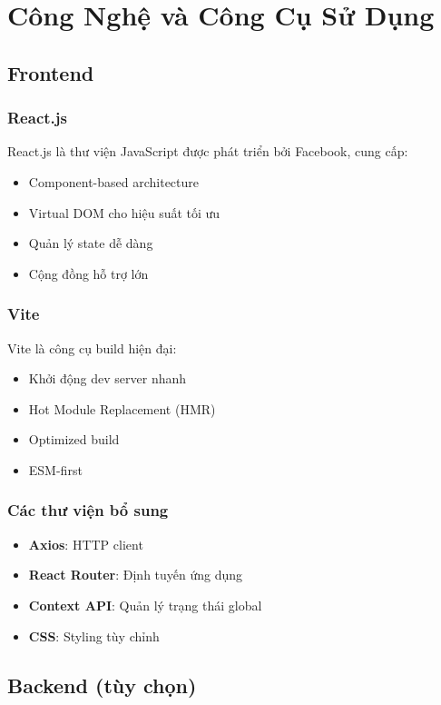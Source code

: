 \documentclass[12pt,a4paper]{report}
\begin{document}
\section{Công Nghệ và Công Cụ Sử Dụng}

\subsection{Frontend}

\subsubsection{React.js}
React.js là thư viện JavaScript được phát triển bởi Facebook, cung cấp:
\begin{itemize}
    \item Component-based architecture
    \item Virtual DOM cho hiệu suất tối ưu
    \item Quản lý state dễ dàng
    \item Cộng đồng hỗ trợ lớn
\end{itemize}

\subsubsection{Vite}
Vite là công cụ build hiện đại:
\begin{itemize}
    \item Khởi động dev server nhanh
    \item Hot Module Replacement (HMR)
    \item Optimized build
    \item ESM-first
\end{itemize}

\subsubsection{Các thư viện bổ sung}
\begin{itemize}
    \item \textbf{Axios}: HTTP client
    \item \textbf{React Router}: Định tuyến ứng dụng
    \item \textbf{Context API}: Quản lý trạng thái global
    \item \textbf{CSS}: Styling tùy chỉnh
\end{itemize}

\subsection{Backend (tùy chọn)}
\end{document}
